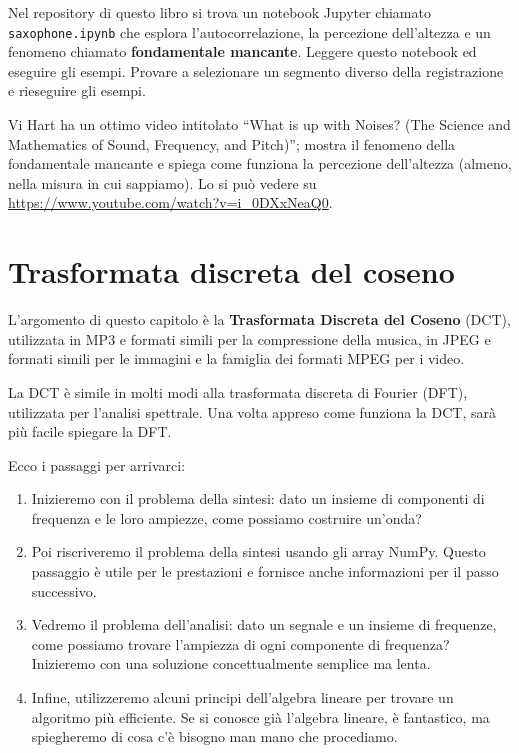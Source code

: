 \documentclass[12pt,a4paper]{book}
\begin{document}
\begin{exercise} Nel repository di questo libro si trova un notebook Jupyter chiamato \verb"saxophone.ipynb" che esplora l'autocorrelazione, la percezione dell'altezza e un fenomeno chiamato {\bf fondamentale mancante}. Leggere questo notebook ed eseguire gli esempi. Provare a selezionare un segmento diverso della registrazione e rieseguire gli esempi.

Vi Hart ha un ottimo video intitolato ``What is up with Noises? (The Science and Mathematics of Sound, Frequency, and Pitch)''; mostra il fenomeno della fondamentale mancante e spiega come funziona la percezione dell'altezza (almeno, nella misura in cui sappiamo). Lo si può vedere su \url{https://www.youtube.com/watch?v=i_0DXxNeaQ0}.

\end{exercise} 

\chapter{Trasformata discreta del coseno} \label{dct} 

L'argomento di questo capitolo è la {\bf Trasformata Discreta del Coseno} (DCT), utilizzata in MP3 e formati simili per la compressione della musica, in JPEG e formati simili per le immagini e la famiglia dei formati MPEG per i video.

La DCT è simile in molti modi alla trasformata discreta di Fourier (DFT), utilizzata per l'analisi spettrale. Una volta appreso come funziona la DCT, sarà più facile spiegare la DFT.

Ecco i passaggi per arrivarci:

\begin{enumerate} 

\item Inizieremo con il problema della sintesi: dato un insieme di componenti di frequenza e le loro ampiezze, come possiamo costruire un'onda?

\item Poi riscriveremo il problema della sintesi usando gli array NumPy. Questo passaggio è utile per le prestazioni e fornisce anche informazioni per il passo successivo.

\item Vedremo il problema dell'analisi: dato un segnale e un insieme di frequenze, come possiamo trovare l'ampiezza di ogni componente di frequenza? Inizieremo con una soluzione concettualmente semplice ma lenta.

\item Infine, utilizzeremo alcuni principi dell'algebra lineare per trovare un algoritmo più efficiente. Se si conosce già l'algebra lineare, è fantastico, ma spiegheremo di cosa c'è bisogno man mano che procediamo.

\end{enumerate} 
\end{document}

